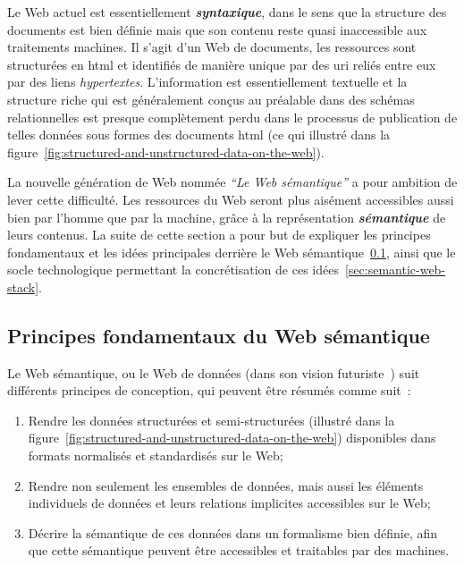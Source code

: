 Le Web actuel est essentiellement \emph{\textbf{syntaxique}}, dans le
sens que la structure des documents est bien définie mais que son
contenu reste quasi inaccessible aux traitements machines. Il s'agit
d'un Web de documents, les ressources sont structurées en
\acrshort{html} et identifiés de manière unique par des \acrshort{uri}
reliés entre eux par des liens \emph{hypertextes}. L'information est
essentiellement textuelle et la structure riche qui est généralement
conçus au préalable dans des schémas relationnelles est presque
complètement perdu dans le processus de publication de telles données
sous formes des documents \acrshort{html} (ce qui illustré dans la
figure~\ref{fig:structured-and-unstructured-data-on-the-web}).\medskip

La nouvelle génération de Web nommée \emph{``Le Web sémantique''} a
pour ambition de lever cette difficulté. Les ressources du Web seront
plus aisément accessibles aussi bien par l'homme que par la machine,
grâce à la représentation \emph{\textbf{sémantique}} de leurs
contenus. La suite de cette section a pour but de expliquer les
principes fondamentaux et les idées principales derrière le Web
sémantique~\ref{sec:semantic-web-design-decisions}, ainsi que le socle
technologique permettant la concrétisation de ces
idées~\ref{sec:semantic-web-stack}.\medskip

\subsection{Principes fondamentaux du Web sémantique}
\label{sec:semantic-web-design-decisions}

Le Web sémantique, ou le Web de données (dans son vision
futuriste~\cite{bizer2008linked}) suit différents principes de
conception, qui peuvent être résumés comme
suit~\cite{antoniou2012semantic}:\medskip

\begin{enumerate}
\item Rendre les données structurées et semi-structurées (illustré
  dans la
  figure~\ref{fig:structured-and-unstructured-data-on-the-web})
  disponibles dans formats normalisés et standardisés sur le
  Web;\medskip

\item Rendre non seulement les ensembles de données, mais aussi les
  éléments individuels de données et leurs relations implicites
  accessibles sur le Web;\medskip

\item Décrire la sémantique de ces données dans un formalisme bien
  définie, afin que cette sémantique peuvent être accessibles et
  traitables par des machines.
\end{enumerate}

